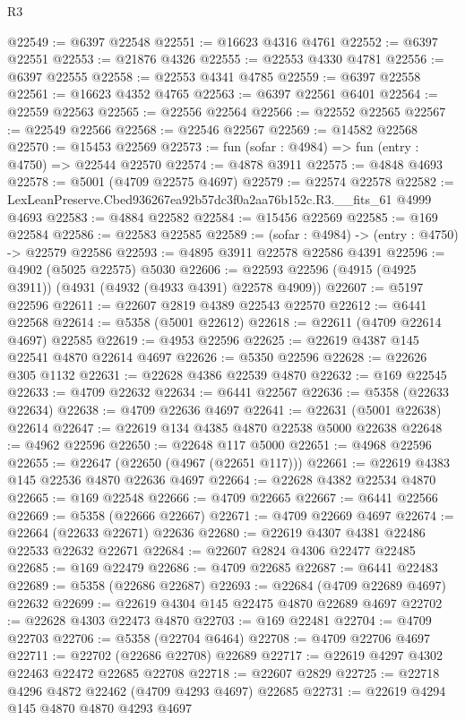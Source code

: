 \begin{lexlean}{R3}
\begin{coremodule}
@22549 := @6397 @22548
@22551 := @16623 @4316 @4761
@22552 := @6397 @22551
@22553 := @21876 @4326
@22555 := @22553 @4330 @4781
@22556 := @6397 @22555
@22558 := @22553 @4341 @4785
@22559 := @6397 @22558
@22561 := @16623 @4352 @4765
@22563 := @6397 @22561 @6401
@22564 := @22559 @22563
@22565 := @22556 @22564
@22566 := @22552 @22565
@22567 := @22549 @22566
@22568 := @22546 @22567
@22569 := @14582 @22568
@22570 := @15453 @22569
@22573 := fun (sofar : @4984) => fun (entry : @4750) => @22544 @22570
@22574 := @4878 @3911
@22575 := @4848 @4693
@22578 := @5001 (@4709 @22575 @4697)
@22579 := @22574 @22578
@22582 := LexLeanPreserve.Cbed936267ea92b57dc3f0a2aa76b152c.R3.__fits_61 @4999 @4693
@22583 := @4884 @22582
@22584 := @15456 @22569
@22585 := @169 @22584
@22586 := @22583 @22585
@22589 := (sofar : @4984) -> (entry : @4750) -> @22579 @22586
@22593 := @4895 @3911 @22578 @22586 @4391
@22596 := @4902 (@5025 @22575) @5030
@22606 := @22593 @22596 (@4915 (@4925 @3911)) (@4931 (@4932 (@4933 @4391) @22578 @4909))
@22607 := @5197 @22596
@22611 := @22607 @2819 @4389 @22543 @22570
@22612 := @6441 @22568
@22614 := @5358 (@5001 @22612)
@22618 := @22611 (@4709 @22614 @4697) @22585
@22619 := @4953 @22596
@22625 := @22619 @4387 @145 @22541 @4870 @22614 @4697
@22626 := @5350 @22596
@22628 := @22626 @305 @1132
@22631 := @22628 @4386 @22539 @4870
@22632 := @169 @22545
@22633 := @4709 @22632
@22634 := @6441 @22567
@22636 := @5358 (@22633 @22634)
@22638 := @4709 @22636 @4697
@22641 := @22631 (@5001 @22638) @22614
@22647 := @22619 @134 @4385 @4870 @22538 @5000 @22638
@22648 := @4962 @22596
@22650 := @22648 @117 @5000
@22651 := @4968 @22596
@22655 := @22647 (@22650 (@4967 (@22651 @117)))
@22661 := @22619 @4383 @145 @22536 @4870 @22636 @4697
@22664 := @22628 @4382 @22534 @4870
@22665 := @169 @22548
@22666 := @4709 @22665
@22667 := @6441 @22566
@22669 := @5358 (@22666 @22667)
@22671 := @4709 @22669 @4697
@22674 := @22664 (@22633 @22671) @22636
@22680 := @22619 @4307 @4381 @22486 @22533 @22632 @22671
@22684 := @22607 @2824 @4306 @22477 @22485
@22685 := @169 @22479
@22686 := @4709 @22685
@22687 := @6441 @22483
@22689 := @5358 (@22686 @22687)
@22693 := @22684 (@4709 @22689 @4697) @22632
@22699 := @22619 @4304 @145 @22475 @4870 @22689 @4697
@22702 := @22628 @4303 @22473 @4870
@22703 := @169 @22481
@22704 := @4709 @22703
@22706 := @5358 (@22704 @6464)
@22708 := @4709 @22706 @4697
@22711 := @22702 (@22686 @22708) @22689
@22717 := @22619 @4297 @4302 @22463 @22472 @22685 @22708
@22718 := @22607 @2829
@22725 := @22718 @4296 @4872 @22462 (@4709 @4293 @4697) @22685
@22731 := @22619 @4294 @145 @4870 @4870 @4293 @4697

\end{coremodule}
\end{lexlean}
